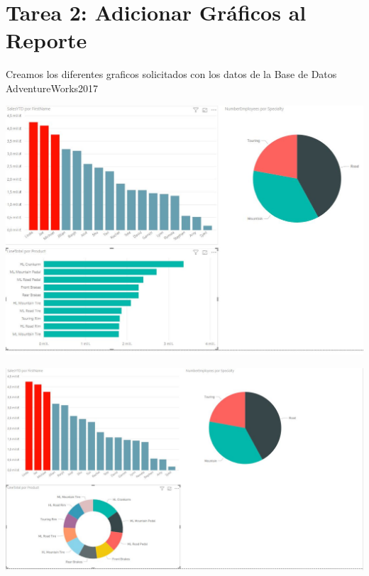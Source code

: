 \section{Tarea 2: Adicionar Gráficos al Reporte} 

Creamos los diferentes graficos solicitados con los datos de la Base de Datos AdventureWorks2017

	\begin{center}
	\includegraphics[width=18cm]{./Imagenes/cap16}
	\end{center}	
	
	\begin{center}
	\includegraphics[width=18cm]{./Imagenes/cap17}
	\end{center}